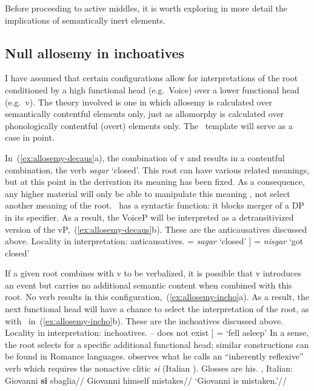 Before proceeding to active middles, it is worth exploring in more detail the implications of semantically inert elements.

  \subsection{Null allosemy in inchoatives} \label{syn:middle:nonactive:null}
I have assumed that certain configurations allow for interpretations of the root conditioned by a high functional head (e.g.~Voice) over a lower functional head (e.g.~v). The theory involved is one in which allosemy is calculated over semantically contentful elements only, just as allomorphy is calculated over phonologically contentful (overt) elements only. The \tnif~template will serve as a case in point.

In~(\ref{ex:allosemy-decaus}a), the combination of v and  results in a contentful combination, the verb \emph{sagar} `closed'. This root can have various related meanings, but at this point in the derivation its meaning has been fixed. As a consequence, any higher material will only be able to manipulate this meaning \citep{arad03}, not select another meaning of the root. \vz~has a syntactic function: it blocks merger of a DP in its specifier. As a result, the VoiceP will be interpreted as a detransitivized version of the vP,~(\ref{ex:allosemy-decaus}b). These are the anticausatives discussed above.
\pex Locality in interpretation: anticausatives.\label{ex:allosemy-decaus}
    \a {} = \emph{sagar} `closed'
    \a {[} \fbox{\textbf{\vz}}  ] = \emph{nisgar} `got closed'
\xe

If a given root combines with v to be verbalized, it is possible that v introduces an event but carries no additional semantic content when combined with this root. No verb results in this configuration,~(\ref{ex:allosemy-incho}a). As a result, the next functional head will have a chance to select the interpretation of the root, as with \vz~in~(\ref{ex:allosemy-incho}b). These are the inchoatives discussed above.
\pex Locality in interpretation: inchoatives.\label{ex:allosemy-incho}
    \a {} -- does not exist
    \a {[} \fbox{\textbf{\vz}}  ] = `fell asleep'
\xe
In a sense, the root selects for a specific additional functional head; similar constructions can be found in Romance languages. \cite{burzio86} observes what he calls an ``inherently reflexive'' verb which requires the nonactive clitic \emph{si} (Italian ). Glosses are his.
\pex \citet[39]{burzio86}, Italian:
	\a \begingl
		\gla Giovanni \textbf{si} sbaglia//
		\glb Giovanni himself mistakes//
		\glft `Giovanni is mistaken.'//
	\endgl
	

